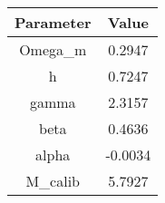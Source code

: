 \begin{table}
\centering
\begin{tabular}{cc}
Parameter & Value \\ 
\hline
Omega_m & 0.2947 \\ 
h & 0.7247 \\ 
gamma & 2.3157 \\ 
beta & 0.4636 \\ 
alpha & -0.0034 \\ 
M_calib & 5.7927 \\ 
\end{tabular}
\end{table}
